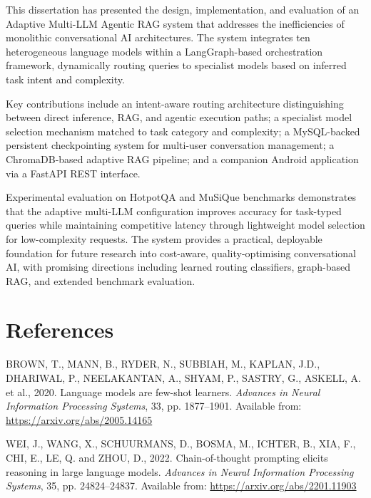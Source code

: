 \documentclass[12pt,a4paper]{article}
\begin{document}
This dissertation has presented the design, implementation, and evaluation of an Adaptive Multi-LLM Agentic RAG system that addresses the inefficiencies of monolithic conversational AI architectures. The system integrates ten heterogeneous language models within a LangGraph-based orchestration framework, dynamically routing queries to specialist models based on inferred task intent and complexity.

Key contributions include an intent-aware routing architecture distinguishing between direct inference, RAG, and agentic execution paths; a specialist model selection mechanism matched to task category and complexity; a MySQL-backed persistent checkpointing system for multi-user conversation management; a ChromaDB-based adaptive RAG pipeline; and a companion Android application via a FastAPI REST interface.

Experimental evaluation on HotpotQA and MuSiQue benchmarks demonstrates that the adaptive multi-LLM configuration improves accuracy for task-typed queries while maintaining competitive latency through lightweight model selection for low-complexity requests. The system provides a practical, deployable foundation for future research into cost-aware, quality-optimising conversational AI, with promising directions including learned routing classifiers, graph-based RAG, and extended benchmark evaluation.

\newpage



\section*{References}

\setlength{\parindent}{0pt}
\setlength{\parskip}{0.8em}

\justifying
\sloppy


BROWN, T., MANN, B., RYDER, N., SUBBIAH, M., KAPLAN, J.D., DHARIWAL, P., NEELAKANTAN, A., SHYAM, P., SASTRY, G., ASKELL, A. et al., 2020. Language models are few-shot learners. \textit{Advances in Neural Information Processing Systems}, 33, pp. 1877--1901. Available from: \url{https://arxiv.org/abs/2005.14165}

WEI, J., WANG, X., SCHUURMANS, D., BOSMA, M., ICHTER, B., XIA, F., CHI, E., LE, Q. and ZHOU, D., 2022. Chain-of-thought prompting elicits reasoning in large language models. \textit{Advances in Neural Information Processing Systems}, 35, pp. 24824--24837. Available from: \url{https://arxiv.org/abs/2201.11903}
\end{document}

